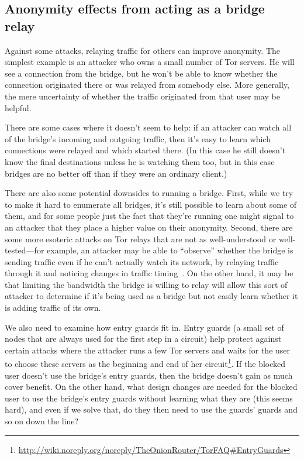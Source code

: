 \documentclass{llncs}
\begin{document}
\subsection{Anonymity effects from acting as a bridge relay}

Against some attacks, relaying traffic for others can improve
anonymity. The simplest example is an attacker who owns a small number
of Tor servers. He will see a connection from the bridge, but he won't
be able to know whether the connection originated there or was relayed
from somebody else. More generally, the mere uncertainty of whether the
traffic originated from that user may be helpful.

There are some cases where it doesn't seem to help: if an attacker can
watch all of the bridge's incoming and outgoing traffic, then it's easy
to learn which connections were relayed and which started there. (In this
case he still doesn't know the final destinations unless he is watching
them too, but in this case bridges are no better off than if they were
an ordinary client.)

There are also some potential downsides to running a bridge. First, while
we try to make it hard to enumerate all bridges, it's still possible to
learn about some of them, and for some people just the fact that they're
running one might signal to an attacker that they place a higher value
on their anonymity. Second, there are some more esoteric attacks on Tor
relays that are not as well-understood or well-tested---for example, an
attacker may be able to ``observe'' whether the bridge is sending traffic
even if he can't actually watch its network, by relaying traffic through
it and noticing changes in traffic timing~\cite{attack-tor-oak05}. On
the other hand, it may be that limiting the bandwidth the bridge is
willing to relay will allow this sort of attacker to determine if it's
being used as a bridge but not easily learn whether it is adding traffic
of its own.

We also need to examine how entry guards fit in. Entry guards
(a small set of nodes that are always used for the first
step in a circuit) help protect against certain attacks
where the attacker runs a few Tor servers and waits for
the user to choose these servers as the beginning and end of her
circuit\footnote{\url{http://wiki.noreply.org/noreply/TheOnionRouter/TorFAQ\#EntryGuards}}.
If the blocked user doesn't use the bridge's entry guards, then the bridge
doesn't gain as much cover benefit. On the other hand, what design changes
are needed for the blocked user to use the bridge's entry guards without
learning what they are (this seems hard), and even if we solve that,
do they then need to use the guards' guards and so on down the line?
\end{document}
